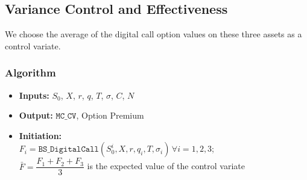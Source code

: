 \subsection{Variance Control and Effectiveness}
We choose the average of the digital call option values on these three assets as a control variate.
\subsubsection{Algorithm}
\begin{itemize}
	\item \textbf{Inputs:} $S_0$, $X$, $r$, $q$, $T$, $\sigma$, $C$, $N$
	\item \textbf{Output:} $\texttt{MC\_CV}$, Option Premium
	\item \textbf{Initiation: }\\ \vspace{1mm}
	$F_i = \texttt{BS\_DigitalCall}(S_0^i, X, r, q_i, T, \sigma_i) \, \forall i = 1,2,3$; \\ \vspace{1mm}
	$\bar{F} = \dfrac{F_1+F_2+F_3}{3}$ is the expected value of the control variate
	

\end{itemize}
